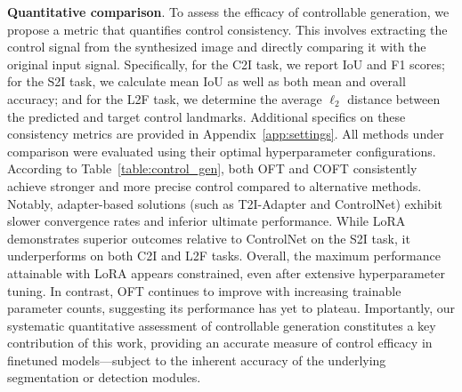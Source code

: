 \textbf{Quantitative comparison}. To assess the efficacy of controllable generation, we propose a metric that quantifies control consistency. This involves extracting the control signal from the synthesized image and directly comparing it with the original input signal. Specifically, for the C2I task, we report IoU and F1 scores; for the S2I task, we calculate mean IoU as well as both mean and overall accuracy; and for the L2F task, we determine the average $\ell_2$ distance between the predicted and target control landmarks. Additional specifics on these consistency metrics are provided in Appendix~\ref{app:settings}. All methods under comparison were evaluated using their optimal hyperparameter configurations. According to Table~\ref{table:control_gen}, both OFT and COFT consistently achieve stronger and more precise control compared to alternative methods. Notably, adapter-based solutions (such as T2I-Adapter and ControlNet) exhibit slower convergence rates and inferior ultimate performance. While LoRA demonstrates superior outcomes relative to ControlNet on the S2I task, it underperforms on both C2I and L2F tasks. Overall, the maximum performance attainable with LoRA appears constrained, even after extensive hyperparameter tuning. In contrast, OFT continues to improve with increasing trainable parameter counts, suggesting its performance has yet to plateau. Importantly, our systematic quantitative assessment of controllable generation constitutes a key contribution of this work, providing an accurate measure of control efficacy in finetuned models—subject to the inherent accuracy of the underlying segmentation or detection modules.

